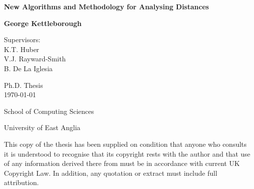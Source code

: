 \documentclass[a4paper,11pt,oneside]{book}
\title{\reporttitle}
\author{\reportauthor}
\newcommand{\reporttitle}{New Algorithms and Methodology for Analysing
  Distances}
\newcommand{\reportauthor}{George Kettleborough}
\newcommand{\0}{{\emptyset}}
\begin{document}

\setcounter{page}{1}

\begin{titlepage}
\begin{center}
\vspace*{0.4in}
{\Huge\bfseries\sffamily \reporttitle\par}
\vspace{.7in}
{\large\bfseries\sffamily \reportauthor\par}
\par
\vspace{.3in}
{ Supervisors:\\
K.T. Huber\\
V.J. Rayward-Smith\\
B. De La Iglesia}
\par
\vspace{0.5in}
Ph.D. Thesis\\
\monthyeardate\today
\par
\vspace{0.5in}
School of Computing Sciences
\par
\vspace{0.5in}
University of East Anglia
\par
\vspace{0.3in}
\par
\vspace{0.3in}
{\small This copy of the thesis has been supplied on condition
  that anyone who consults it is understood to recognise that its copyright
  rests with the author and that use of any information derived there from
  must be in accordance with current UK Copyright Law. In addition, any
  quotation or extract must include full attribution.}
\end{center}
\end{titlepage}


\newpage

\setcounter{page}{2}



\newpage

\tableofcontents
\newpage

\listoffigures
\newpage

\listofalgorithms
{}
\newpage

\listoftables
\newpage
\end{document}
